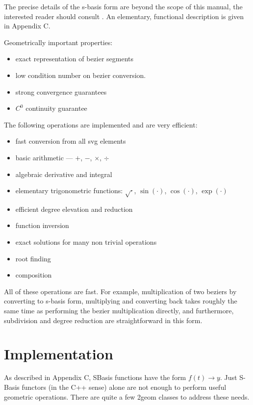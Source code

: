 \documentclass[openany]{book}
\begin{document}
The precise details of the s-basis form are beyond the scope of this
manual, the interested reader should consult \cite{SanchezReyes1997,SanchezReyes2000,SanchezReyes2001,SanchezReyes2003,SanchezReyes2004}.
An elementary, functional description is given in Appendix C.

Geometrically important properties:
\begin{itemize}
\item exact representation of bezier segments
\item low condition number on bezier conversion.
\item strong convergence guarantees
\item $C^0$ continuity guarantee
\end{itemize}

The following operations are implemented and are very efficient:
\begin{itemize}
\item fast conversion from all svg elements
\item basic arithmetic --- $+$, $-$, $\times$, $\div$
\item algebraic derivative and integral
\item elementary trigonometric functions: $\sqrt{\cdot}$, $\sin(\cdot)$, $\cos(\cdot)$, $\exp(\cdot)$
\item efficient degree elevation and reduction
\item function inversion
\item exact solutions for many non trivial operations
\item root finding
\item composition
\end{itemize}

All of these operations are fast.  For example, multiplication of two
beziers by converting to s-basis form, multiplying and converting back
takes roughly the same time as performing the bezier multiplication
directly, and furthermore, subdivision and degree reduction are
straightforward in this form.

\section{Implementation}
As described in Appendix C, SBasis functions have the form $f(t) \rightarrow y$.
Just S-Basis functors (in the C++ sense) alone are not enough to perform
useful geometric operations.  There are quite a few 2geom classes to
address these needs.
\end{document}
